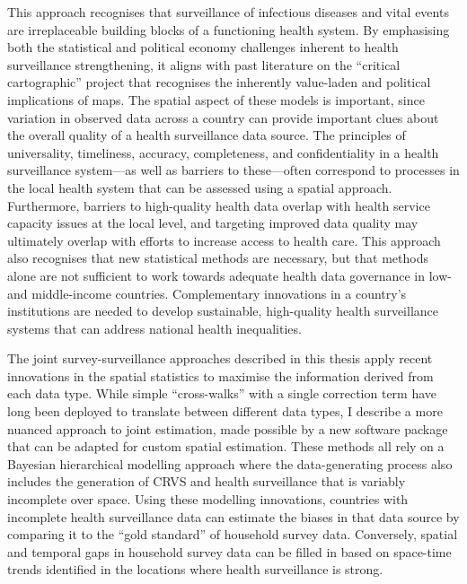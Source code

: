 \documentclass[
]{report}
\begin{document}
This approach recognises that surveillance of infectious diseases and vital events are irreplaceable building blocks of a functioning health system.\autocite{Roberts2008} By emphasising both the statistical and political economy challenges inherent to health surveillance strengthening, it aligns with past literature on the ``critical cartographic'' project that recognises the inherently value-laden and political implications of maps.\autocite{Crampton2006} The spatial aspect of these models is important, since variation in observed data across a country can provide important clues about the overall quality of a health surveillance data source. The principles of universality, timeliness, accuracy, completeness, and confidentiality in a health surveillance system---as well as barriers to these---often correspond to processes in the local health system that can be assessed using a spatial approach. Furthermore, barriers to high-quality health data overlap with health service capacity issues at the local level, and targeting improved data quality may ultimately overlap with efforts to increase access to health care. This approach also recognises that new statistical methods are necessary, but that methods alone are not sufficient to work towards adequate health data governance in low- and middle-income countries.\autocite{Tiffin2019} Complementary innovations in a country's institutions are needed to develop sustainable, high-quality health surveillance systems that can address national health inequalities.

The joint survey-surveillance approaches described in this thesis apply recent innovations in the spatial statistics to maximise the information derived from each data type. While simple ``cross-walks'' with a single correction term have long been deployed to translate between different data types, I describe a more nuanced approach to joint estimation, made possible by a new software package that can be adapted for custom spatial estimation.\autocite{Osgood-Zimmerman2021} These methods all rely on a Bayesian hierarchical modelling approach where the data-generating process also includes the generation of CRVS and health surveillance that is variably incomplete over space.\autocite{Schmertmann2018} Using these modelling innovations, countries with incomplete health surveillance data can estimate the biases in that data source by comparing it to the ``gold standard'' of household survey data. Conversely, spatial and temporal gaps in household survey data can be filled in based on space-time trends identified in the locations where health surveillance is strong.
\end{document}
